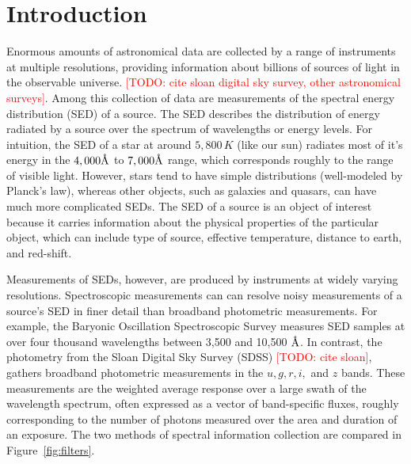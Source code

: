 \documentclass{article}
\newcommand{\angstrom}{\textup{\AA}}
\newcommand{\red}[1]{\textcolor{red}{[TODO: #1]}}
\begin{document}
\section{Introduction}
Enormous amounts of astronomical data are collected by a range of instruments at multiple resolutions, providing information about billions of sources of light in the observable universe. \red{cite sloan digital sky survey, other astronomical surveys}.  
Among this collection of data are measurements of the spectral energy distribution (SED) of a source.  
The SED describes the distribution of energy radiated by a source over the spectrum of wavelengths or energy levels.  
For intuition, the SED of a star at around $5,800\, K$ (like our sun) radiates most of it's energy in the $4,000 \angstrom$ to $7,000\angstrom$ range, which corresponds roughly to the range of visible light.  
However, stars tend to have simple distributions (well-modeled by Planck's law), whereas other objects, such as galaxies and quasars, can have much more complicated SEDs.  
The SED of a source is an object of interest because it carries information about the physical properties of the particular object, which can include type of source, effective temperature, distance to earth, and red-shift. 

Measurements of SEDs, however, are produced by instruments at widely varying resolutions.  
Spectroscopic measurements can can resolve noisy measurements of a source's SED in finer detail than broadband photometric measurements.  For example, the Baryonic Oscillation Spectroscopic Survey \cite{dawson2013baryon} measures SED samples at over four thousand wavelengths between 3,500 and 10,500 $\angstrom$.  
In contrast, the photometry from the Sloan Digital Sky Survey (SDSS) \red{cite sloan}, gathers broadband photometric measurements in the $u,g,r,i,$ and $z$ bands.  These measurements are the weighted average response over a large swath of the wavelength spectrum, often expressed as a vector of band-specific fluxes, roughly corresponding to the number of photons measured over the area and duration of an exposure.  
The two methods of spectral information collection are compared in Figure~\ref{fig:filters}. 
\end{document}
